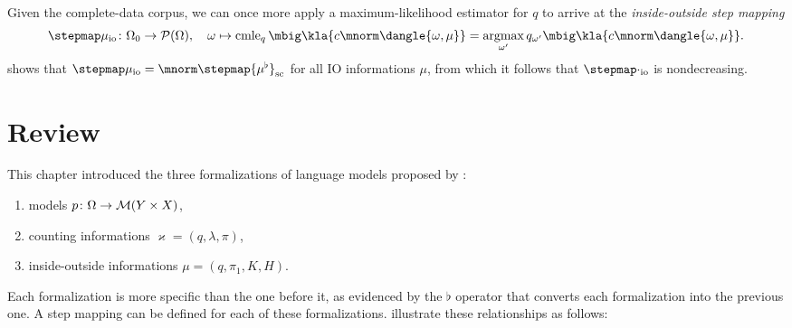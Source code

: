 \clearpage

Given the complete-data corpus, we can once more apply a maximum-likelihood
estimator for $q$ to arrive at the \emph{inside-outside step mapping}
\[
 \stepmap\mu_\mathrm{io}\colon \Omega_0 \to \up(\Omega), \quad
 \omega \mapsto \cmle_q\mbig\kla{c\mnorm\dangle{\omega,\mu}} = \argmax_{\omega'} q_{\omega'}\mbig\kla{c\mnorm\dangle{\omega,\mu}}.
\]
\cite[pp.~16]{bucstuvog15} shows that $\stepmap\mu_\mathrm{io} =
\mnorm\stepmap{\mu^\flat}_\mathrm{sc}$ for all IO informations $\mu$, from
which it follows that $\stepmap\cdot_\mathrm{io}$ is nondecreasing.

\section{Review}

This chapter introduced the three formalizations of language models
proposed by \cite{bucstuvog15}:
\begin{enumerate}\setlength\itemsep{-0.3em}
 \item models $p\colon\Omega\to\mathcal M(Y\times X)$,
 \item counting informations $\varkappa=(q,\lambda,\pi)$,
 \item inside-outside informations $\mu=(q,\pi_1,K,H)$.
\end{enumerate}
Each formalization is more specific than the one before it, as evidenced by the
$\flat$ operator that converts each formalization into the previous one.
A step mapping can be defined for each of these formalizations.
\cite{bucstuvog15} illustrate these relationships as follows:
\begin{center}\end{center}


